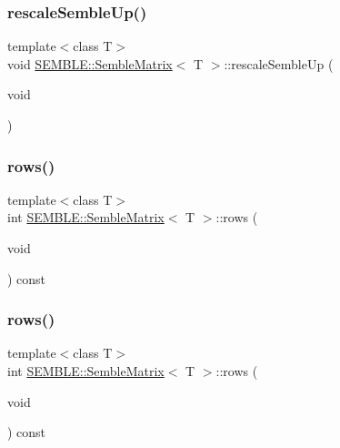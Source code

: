 \subsubsection{\texorpdfstring{rescaleSembleUp()}{rescaleSembleUp()}\hspace{0.1cm}{\footnotesize\ttfamily [2/2]}}
{\footnotesize\ttfamily template$<$class T$>$ \\
void \mbox{\hyperlink{structSEMBLE_1_1SembleMatrix}{S\+E\+M\+B\+L\+E\+::\+Semble\+Matrix}}$<$ T $>$\+::rescale\+Semble\+Up (\begin{DoxyParamCaption}\item[{void}]{ }\end{DoxyParamCaption})}

\mbox{\label{structSEMBLE_1_1SembleMatrix_a89cbc720521103b2a30228a3ca3b1e03}} 
\subsubsection{\texorpdfstring{rows()}{rows()}\hspace{0.1cm}{\footnotesize\ttfamily [1/4]}}
{\footnotesize\ttfamily template$<$class T$>$ \\
int \mbox{\hyperlink{structSEMBLE_1_1SembleMatrix}{S\+E\+M\+B\+L\+E\+::\+Semble\+Matrix}}$<$ T $>$\+::rows (\begin{DoxyParamCaption}\item[{void}]{ }\end{DoxyParamCaption}) const\hspace{0.3cm}{\ttfamily [inline]}}

\mbox{\label{structSEMBLE_1_1SembleMatrix_a89cbc720521103b2a30228a3ca3b1e03}} 
\subsubsection{\texorpdfstring{rows()}{rows()}\hspace{0.1cm}{\footnotesize\ttfamily [2/4]}}
{\footnotesize\ttfamily template$<$class T$>$ \\
int \mbox{\hyperlink{structSEMBLE_1_1SembleMatrix}{S\+E\+M\+B\+L\+E\+::\+Semble\+Matrix}}$<$ T $>$\+::rows (\begin{DoxyParamCaption}\item[{void}]{ }\end{DoxyParamCaption}) const\hspace{0.3cm}{\ttfamily [inline]}}

